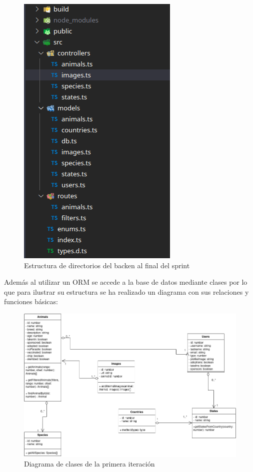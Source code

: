 \begin{enumerate}
	\begin{figure}[H]
		\centering
		\includegraphics[width=0.7\linewidth]{"sprint 1/directoriosBack"}
		\caption{Estructura de directorios del backen al final del sprint}
		\label{fig:directoriosback1}
	\end{figure}
	
	Además al utilizar un ORM se accede a la base de datos mediante clases por lo que para ilustrar su estructura se ha realizado un diagrama con sus relaciones y funciones básicas:
	
	\begin{figure}[H]
		\centering
		\includegraphics[width=1\linewidth]{"sprint 1/clases"}
		\caption{Diagrama de clases de la primera iteración}
		\label{fig:clases}
	\end{figure}
	
\end{enumerate}


